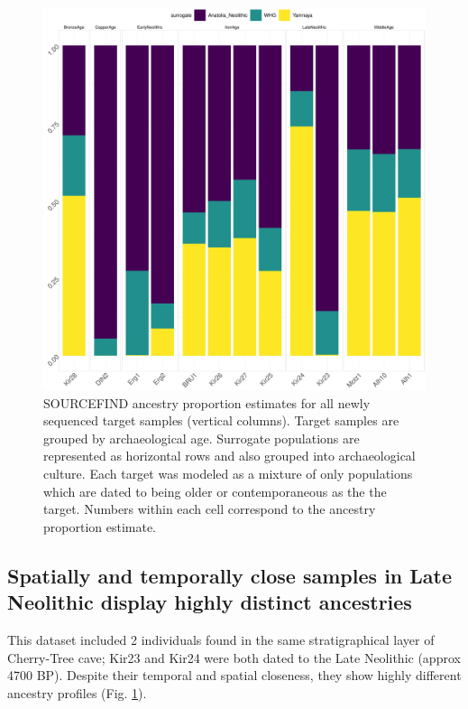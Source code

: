 \begin{figure}[htp]
    \centering
    \includegraphics[width=1.0\textwidth]{../images/chapter4/plots3PopBarlot.pdf}
    \caption{SOURCEFIND ancestry proportion estimates for all newly sequenced target samples (vertical columns). Target samples are grouped by archaeological age. Surrogate populations are represented as horizontal rows and also grouped into archaeological culture. Each target was modeled as a mixture of only populations which are dated to being older or contemporaneous as the the target. Numbers within each cell correspond to the ancestry proportion estimate.}
    \label{fig:plots3PopBarlot}
\end{figure}

\subsection{Spatially and temporally close samples in Late Neolithic display highly distinct ancestries}

This dataset included 2 individuals found in the same stratigraphical layer of Cherry-Tree cave; Kir23 and Kir24 were both dated to the Late Neolithic (approx 4700 BP). Despite their temporal and spatial closeness, they show highly different ancestry profiles (Fig. \ref{fig:plots3PopBarlot}). 


